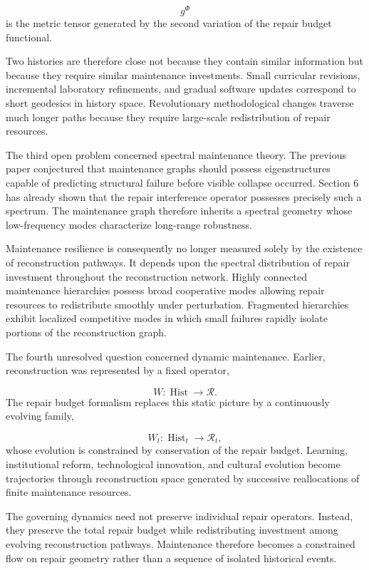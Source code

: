 \documentclass[12pt,oneside]{article}
\theoremstyle{plain}
\theoremstyle{definition}
\theoremstyle{remark}
\DeclareMathOperator{\Hist}{Hist}
\begin{document}
\[
g^{\Phi}
\]
is the metric tensor generated by the second variation of the repair budget functional.

Two histories are therefore close not because they contain similar information but because they require similar maintenance investments. Small curricular revisions, incremental laboratory refinements, and gradual software updates correspond to short geodesics in history space. Revolutionary methodological changes traverse much longer paths because they require large-scale redistribution of repair resources.

The third open problem concerned spectral maintenance theory. The previous paper conjectured that maintenance graphs should possess eigenstructures capable of predicting structural failure before visible collapse occurred. Section 6 has already shown that the repair interference operator possesses precisely such a spectrum. The maintenance graph therefore inherits a spectral geometry whose low-frequency modes characterize long-range robustness.

Maintenance resilience is consequently no longer measured solely by the existence of reconstruction pathways. It depends upon the spectral distribution of repair investment throughout the reconstruction network. Highly connected maintenance hierarchies possess broad cooperative modes allowing repair resources to redistribute smoothly under perturbation. Fragmented hierarchies exhibit localized competitive modes in which small failures rapidly isolate portions of the reconstruction graph.

The fourth unresolved question concerned dynamic maintenance. Earlier, reconstruction was represented by a fixed operator,

\[
W:\Hist\rightarrow\mathcal R.
\]
The repair budget formalism replaces this static picture by a continuously evolving family,

\[
W_t:
\Hist_t
\rightarrow
\mathcal R_t,
\]
whose evolution is constrained by conservation of the repair budget. Learning, institutional reform, technological innovation, and cultural evolution become trajectories through reconstruction space generated by successive reallocations of finite maintenance resources.

The governing dynamics need not preserve individual repair operators. Instead, they preserve the total repair budget while redistributing investment among evolving reconstruction pathways. Maintenance therefore becomes a constrained flow on repair geometry rather than a sequence of isolated historical events.
\end{document}
